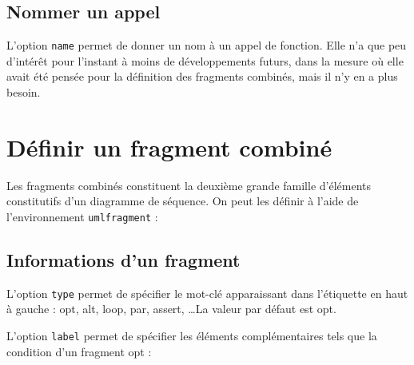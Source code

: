 \documentclass[a4paper,11pt]{report}
\newcommand{\inputTikZ}[1]{%
  }%
\newcommand{\inputTikZ}[1]{%
    \texttt{[image: fig/\#1.pdf]}%
  }%
\begin{document}
\subsection{Nommer un appel}\label{ss.callname}

L'option {\tt name} permet de donner un nom à un appel de fonction. Elle n'a que peu d'intérêt pour l'instant à moins de développements futurs, dans la mesure où elle avait été pensée pour la définition des fragments combinés, mais il n'y en a plus besoin.

\section{Définir un fragment combiné}\label{s.fragments}

Les fragments combinés constituent la deuxième grande famille d'éléments constitutifs d'un diagramme de séquence. On peut les définir à l'aide de l'environnement {\tt umlfragment} :

\medskip

\begin{minipage}{0.5\textwidth}

\end{minipage}
\begin{minipage}{0.5\textwidth}
\begin{center}
\inputTikZ{fragment}
\end{center}
\end{minipage}

\subsection{Informations d'un fragment}\label{ss.fraginfos}

L'option {\tt type} permet de spécifier le mot-clé apparaissant dans l'étiquette en haut à gauche : opt, alt, loop, par, assert, \ldots La valeur par défaut est opt.

L'option {\tt label} permet de spécifier les éléments complémentaires tels que la condition d'un fragment opt : 

\medskip

\begin{minipage}{0.5\textwidth}

\end{minipage}
\begin{minipage}{0.5\textwidth}
\begin{center}
\inputTikZ{fragmentlabel}
\end{center}
\end{minipage}
\end{document}

